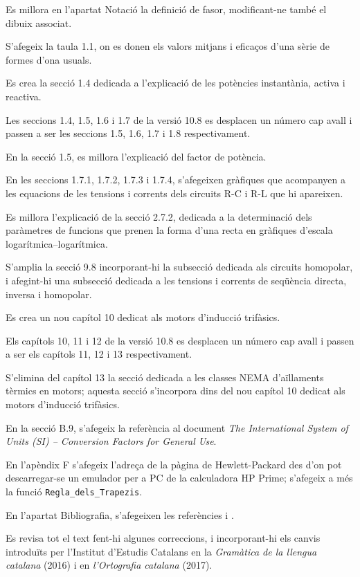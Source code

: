 Es millora en l'apartat Notació la definició de  fasor, modificant-ne també el dibuix associat.

S'afegeix la taula 1.1, on es donen els valors mitjans i eficaços d'una sèrie de formes d'ona usuals.

Es crea la secció 1.4 dedicada a l'explicació de  les potències instantània, activa i reactiva.

Les seccions 1.4, 1.5, 1.6 i 1.7 de la versió 10.8 es desplacen un número cap
avall i passen a ser les seccions 1.5, 1.6, 1.7 i 1.8 respectivament.

En la secció 1.5, es millora l'explicació del factor de potència.

En les seccions 1.7.1, 1.7.2, 1.7.3 i 1.7.4, s'afegeixen gràfiques que acompanyen a les equacions de les tensions i corrents  dels circuits R-C i R-L que hi apareixen.

Es millora l'explicació de  la secció 2.7.2, dedicada
a la determinació dels paràmetres de funcions que prenen la forma d’una recta en gràfiques d’escala
logarítmica–logarítmica.

S'amplia la secció 9.8 incorporant-hi la subsecció dedicada als circuits homopolar, i afegint-hi una subsecció dedicada a les tensions i corrents de seqüència directa, inversa i homopolar.

Es crea un nou capítol 10 dedicat als motors d'inducció trifàsics.

Els capítols 10, 11 i 12 de la versió 10.8 es desplacen un número cap
avall i passen a ser els capítols 11, 12 i 13 respectivament.

S'elimina del capítol 13 la secció dedicada a les classes NEMA d’aïllaments tèrmics en motors; aquesta secció s'incorpora dins del nou capítol 10 dedicat als motors d'inducció trifàsics.

En la secció B.9, s'afegeix la referència al document \textit{The International System of Units (SI) – Conversion Factors for General Use}.

En l'apèndix F s'afegeix l'adreça de la pàgina de Hewlett-Packard des d'on pot descarregar-se un emulador per a PC de la calculadora \textsf{HP Prime}; s'afegeix a més la funció \texttt{Regla\_dels\_Trapezis}.

En l’apartat Bibliografia, s’afegeixen les referències  \cite{JFM} i \cite{WES}.

Es revisa tot el text fent-hi algunes correccions,  i incorporant-hi els canvis introduïts per l’Institut d’Estudis Catalans en la \emph{Gramàtica de la llengua catalana}
(2016) i en \emph{l’Ortografia catalana} (2017).


